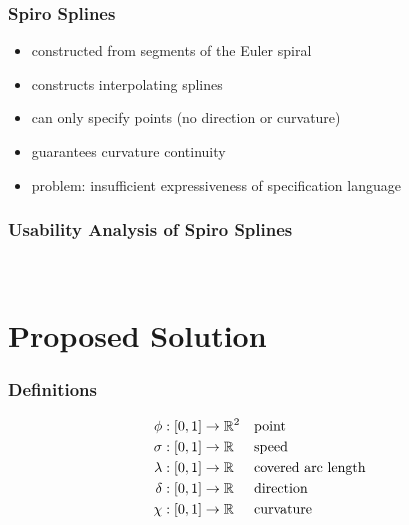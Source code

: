 \documentclass[mathserif]{beamer}
\begin{document}
		\begin{frame}
			\frametitle{Spiro Splines}
			\begin{itemize}
				\item constructed from segments of the Euler spiral
				\item constructs interpolating splines
				\item can only specify points (no direction or curvature)
				\item guarantees curvature continuity
				\item problem: insufficient expressiveness of specification language
			\end{itemize}
		\end{frame}
		
		\begin{frame}
			\frametitle{Usability Analysis of Spiro Splines}
			\\
		\end{frame}
	
	\section{Proposed Solution}
	
		\begin{frame}
			\frametitle{Definitions}
			\begin{align*}
				\phi    & : \left[ 0,1 \right] \rightarrow \mathbb{R}^{2} && \text{point}\\
				\sigma  & : \left[ 0,1 \right] \rightarrow \mathbb{R}   && \text{speed}\\
				\lambda & : \left[ 0,1 \right] \rightarrow \mathbb{R}   && \text{covered arc length}\\
				\delta  & : \left[ 0,1 \right] \rightarrow \mathbb{R}   && \text{direction}\\
				\chi    & : \left[ 0,1 \right] \rightarrow \mathbb{R}   && \text{curvature}
			\end{align*}
		\end{frame}
		
\end{document}
